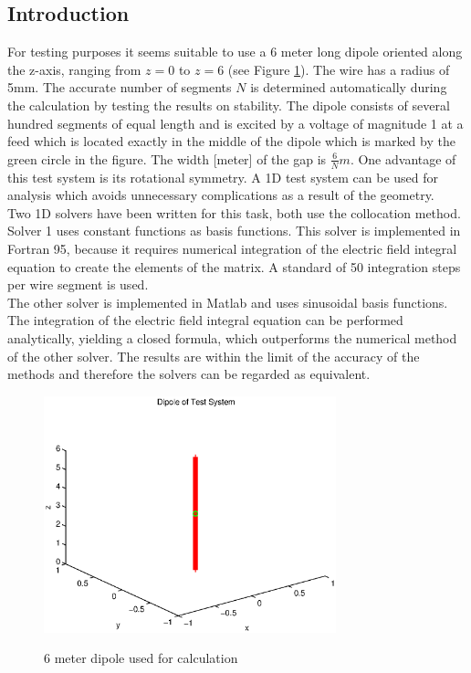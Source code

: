 \documentclass[two-column,ras]{agutex}
\begin{document}
\begin{article}
\subsection{Introduction}
For testing purposes it seems suitable to use a 6 meter long dipole oriented along the z-axis, ranging from $z=0$ to $z=6$ (see Figure \ref{figDipol}). The wire has a radius of 5mm. The accurate number of segments $N$ is determined automatically during the calculation by testing the results on stability. The dipole consists of several hundred segments of equal length and is excited by a voltage of magnitude 1 at a feed which is located exactly in the middle of the dipole which is marked by the green circle in the figure. The width [meter] of the gap is $\frac{6}{N}m$. One advantage of this test system is its rotational symmetry. A 1D test system can be used for analysis which avoids unnecessary complications as a result of the geometry.\\

Two 1D solvers have been written for this task, both use the collocation method. Solver 1 uses constant functions as basis functions. This solver is implemented in Fortran 95, because it requires numerical integration of the electric field integral equation to create the elements of the matrix. A standard of 50 integration steps per wire segment is used.\\

The other solver is implemented in Matlab and uses sinusoidal basis functions. The integration of the electric field integral equation can be performed analytically, yielding a closed formula, which outperforms the numerical method of the other solver. The results are within the limit of the accuracy of the methods and therefore the solvers can be regarded as equivalent.\\



\begin{figure}
 \noindent\includegraphics[width=20pc]{dipol.eps}\\
  \caption{6 meter dipole used for calculation}\label{figDipol}
\end{figure}


\end{article}
\end{document}
